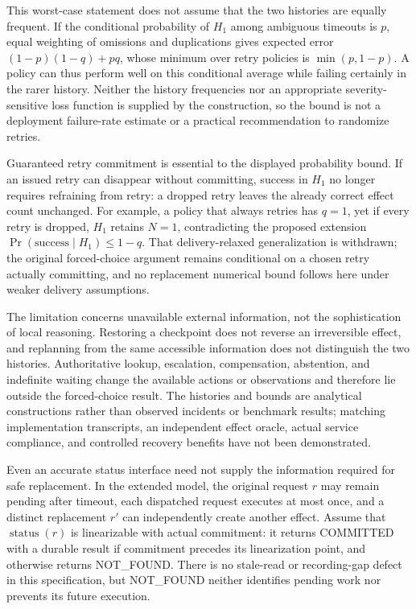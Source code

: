 \documentclass[11pt]{article}
\begin{document}
This worst-case statement does not assume that the two histories are equally frequent. If the conditional probability of $H_1$ among ambiguous timeouts is $p$, equal weighting of omissions and duplications gives expected error $(1-p)(1-q)+pq$, whose minimum over retry policies is $\min(p,1-p)$. A policy can thus perform well on this conditional average while failing certainly in the rarer history. Neither the history frequencies nor an appropriate severity-sensitive loss function is supplied by the construction, so the bound is not a deployment failure-rate estimate or a practical recommendation to randomize retries.

Guaranteed retry commitment is essential to the displayed probability bound. If an issued retry can disappear without committing, success in $H_1$ no longer requires refraining from retry: a dropped retry leaves the already correct effect count unchanged. For example, a policy that always retries has $q=1$, yet if every retry is dropped, $H_1$ retains $N=1$, contradicting the proposed extension $\Pr(\mathrm{success}\mid H_1)\leq 1-q$. That delivery-relaxed generalization is withdrawn; the original forced-choice argument remains conditional on a chosen retry actually committing, and no replacement numerical bound follows here under weaker delivery assumptions.

The limitation concerns unavailable external information, not the sophistication of local reasoning. Restoring a checkpoint does not reverse an irreversible effect, and replanning from the same accessible information does not distinguish the two histories. Authoritative lookup, escalation, compensation, abstention, and indefinite waiting change the available actions or observations and therefore lie outside the forced-choice result. The histories and bounds are analytical constructions rather than observed incidents or benchmark results; matching implementation transcripts, an independent effect oracle, actual service compliance, and controlled recovery benefits have not been demonstrated.

Even an accurate status interface need not supply the information required for safe replacement. In the extended model, the original request $r$ may remain pending after timeout, each dispatched request executes at most once, and a distinct replacement $r'$ can independently create another effect. Assume that $\operatorname{status}(r)$ is linearizable with actual commitment: it returns COMMITTED with a durable result if commitment precedes its linearization point, and otherwise returns NOT\_\allowbreak{}FOUND. There is no stale-read or recording-gap defect in this specification, but NOT\_\allowbreak{}FOUND neither identifies pending work nor prevents its future execution.
\end{document}

